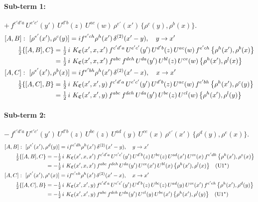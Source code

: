 \documentclass[10pt]{article}
\numberwithin{equation}{section}
\begin{document}
\paragraph{Sub-term 1:} $+\,f^{c'd'a}\,U^{e'c'}(y')\,U^{d'b}(z)\,U^{ac}(w)\,\rho^{e'}(x')\,\big\{\rho^{c}(y),\rho^{b}(x)\big\}$.
\begin{align}
&[A,B]:\ [\rho^{e'}(x'),\rho^{c}(y)]=i f^{e'ch}\rho^{h}(x')\,\delta^{(2)}(x'-y),\quad y\to x'\notag\\
&\qquad \tfrac12\{[A,B],C\}=\tfrac12\,i\,\,K_{\mathfrak C}(x',x,x')\,f^{c'd'a}\,U^{e'c'}(y')\,U^{d'b}(z)\,U^{ac}(w)\,f^{e'ch}\,\big\{\rho^{h}(x'),\rho^{b}(x)\big\}\notag\\
&\qquad\phantom{\tfrac12\{[A,B],C\}}=\tfrac12\,i\,\,K_{\mathfrak C}(x',x,x')\,f^{abc}\,f^{deh}\,U^{da}(y')\,U^{bl}(z)\,U^{ce}(w)\,\big\{\rho^{h}(x'),\rho^{l}(x)\big\}
\label{R:eq:GIII.III-1-AB}\\
&[A,C]:\ [\rho^{e'}(x'),\rho^{b}(x)]=i f^{e'bh}\rho^{h}(x')\,\delta^{(2)}(x'-x),\quad x\to x'\notag\\
&\qquad \tfrac12\{[A,C],B\}=\tfrac12\,i\,\,K_{\mathfrak C}(x',x',y)\,f^{c'd'a}\,U^{e'c'}(y')\,U^{d'b}(z)\,U^{ac}(w)\,f^{e'bh}\,\big\{\rho^{h}(x'),\rho^{c}(y)\big\}\notag\\
&\qquad\phantom{\tfrac12\{[A,C],B\}}=\tfrac12\,i\,\,K_{\mathfrak C}(x',x',y)\,f^{abc}\,f^{deh}\,U^{da}(y')\,U^{be}(z)\,U^{cl}(w)\,\big\{\rho^{h}(x'),\rho^{l}(y)\big\}
\label{R:eq:GIII.III-1-AC}
\end{align}
\paragraph{Sub-term 2:} $-\,f^{c'd'a}\,U^{e'c'}(y')\,U^{d'b}(z)\,U^{bc}(z)\,U^{ad}(y)\,U^{ce}(x)\,\rho^{e'}(x')\,\big\{\rho^{d}(y),\rho^{e}(x)\big\}$.
\begin{align}
&[A,B]:\ [\rho^{e'}(x'),\rho^{d}(y)]=i f^{e'dh}\rho^{h}(x')\,\delta^{(2)}(x'-y),\quad y\to x'\notag\\
&\qquad \tfrac12\{[A,B],C\}=-\tfrac12\,i\,\,K_{\mathfrak C}(x',x,x')\,f^{c'd'a}\,U^{e'c'}(y')\,U^{d'b}(z)\,U^{bc}(z)\,U^{ad}(x')\,U^{ce}(x)\,f^{e'dh}\,\big\{\rho^{h}(x'),\rho^{e}(x)\big\}\notag\\
&\qquad\phantom{\tfrac12\{[A,B],C\}}=-\tfrac12\,i\,\,K_{\mathfrak C}(x',x,x')\,f^{abc}\,f^{deh}\,U^{da}(y')\,U^{ce}(x')\,U^{bl}(x)\,\big\{\rho^{h}(x'),\rho^{l}(x)\big\}\quad\text{(U1$^\star$)}
\label{R:eq:GIII.III-2-AB}\\
&[A,C]:\ [\rho^{e'}(x'),\rho^{e}(x)]=i f^{e'eh}\rho^{h}(x')\,\delta^{(2)}(x'-x),\quad x\to x'\notag\\
&\qquad \tfrac12\{[A,C],B\}=-\tfrac12\,i\,\,K_{\mathfrak C}(x',x',y)\,f^{c'd'a}\,U^{e'c'}(y')\,U^{d'b}(z)\,U^{bc}(z)\,U^{ad}(y)\,U^{ce}(x')\,f^{e'eh}\,\big\{\rho^{h}(x'),\rho^{d}(y)\big\}\notag\\
&\qquad\phantom{\tfrac12\{[A,C],B\}}=-\tfrac12\,i\,\,K_{\mathfrak C}(x',x',y)\,f^{abc}\,f^{deh}\,U^{da}(y')\,U^{cl}(y)\,U^{be}(x')\,\big\{\rho^{h}(x'),\rho^{l}(y)\big\}\quad\text{(U1$^\star$)}
\label{R:eq:GIII.III-2-AC}
\end{align}
\end{document}
